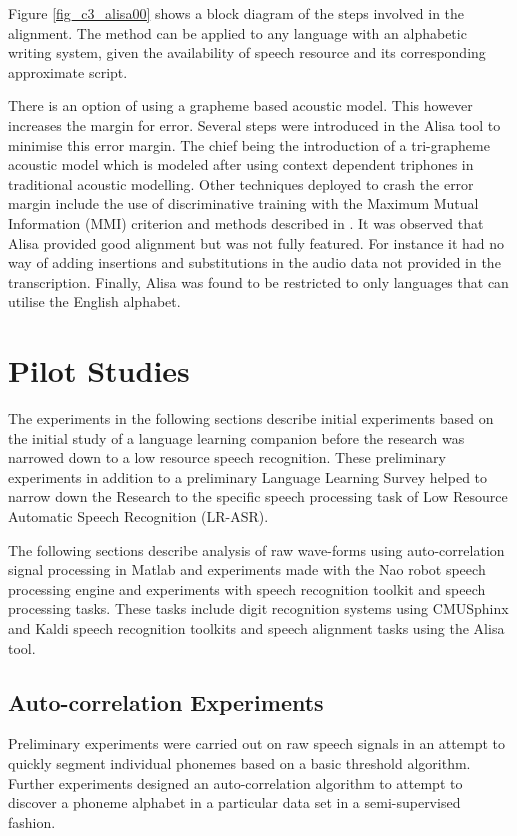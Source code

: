 Figure \ref{fig_c3_alisa00} shows a block diagram of the steps involved in the alignment.  The method can be applied to any language with an alphabetic writing system, given the availability of speech resource and its corresponding approximate script.

There is an option of using a grapheme based acoustic model. This however increases the margin for error.  Several steps were introduced in the Alisa tool to minimise this error margin. The chief being the introduction of a tri-grapheme acoustic model which is modeled after using context dependent triphones in traditional acoustic modelling.  Other techniques deployed to crash the error margin include the use of discriminative training with the Maximum Mutual Information (MMI) criterion \citep{schluter2001model} and methods described in \citep{novotney2009analysis}. It was observed that Alisa provided good alignment but was not fully featured. For instance it had no way of adding insertions and substitutions in the audio data not provided in the transcription.  Finally, Alisa was found to be restricted to only languages that can utilise the English alphabet.

\section{Pilot Studies}
The experiments in the following sections describe initial experiments based on the initial study of a language learning companion before the research was narrowed down to a low resource speech recognition.  These preliminary experiments in addition to a preliminary Language Learning Survey helped to narrow down the Research to the specific speech processing task of Low Resource Automatic Speech Recognition (LR-ASR).

The following sections describe analysis of raw wave-forms using auto-correlation signal processing in Matlab and experiments made with the Nao robot speech processing engine and experiments with speech recognition toolkit and speech processing tasks.  These tasks include digit recognition systems using CMUSphinx and Kaldi speech recognition toolkits and speech alignment tasks using the Alisa tool.

\subsection{Auto-correlation Experiments}\label{sec_c3_corr}
Preliminary experiments were carried out on raw speech signals in an attempt to quickly segment individual phonemes based on a basic threshold algorithm.  Further experiments designed an auto-correlation algorithm to attempt to discover a phoneme alphabet in a particular data set in a semi-supervised fashion.
 
